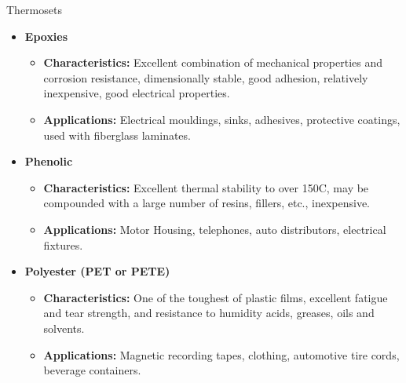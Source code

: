 \documentclass[11pt,t]{beamer}
\begin{document}
\begin{frame}[allowframebreaks]{Thermosets}
        \framebreak

        \begin{itemize}
            \item \textbf{Epoxies}
            \begin{itemize}
                \item \textbf{Characteristics:} Excellent combination of mechanical properties and corrosion
                resistance, dimensionally stable, good adhesion, relatively inexpensive, good electrical properties.
                \item \textbf{Applications:} Electrical mouldings, sinks, adhesives, protective coatings, used with
                fiberglass laminates.
            \end{itemize}
            \item \textbf{Phenolic}
            \begin{itemize}
                \item \textbf{Characteristics:} Excellent thermal stability to over 150\textdegree C, may be
                compounded with a large number of resins, fillers, etc., inexpensive.
                \item \textbf{Applications:} Motor Housing, telephones, auto distributors, electrical fixtures.
            \end{itemize}
            \item \textbf{Polyester (PET or PETE)}
            \begin{itemize}
                \item \textbf{Characteristics:} One of the toughest of plastic films, excellent fatigue and tear
                strength, and resistance to humidity acids, greases, oils and solvents.
                \item \textbf{Applications:} Magnetic recording tapes, clothing, automotive tire cords, beverage
                containers.
            \end{itemize}
        \end{itemize}
    \end{frame}
\end{document}

